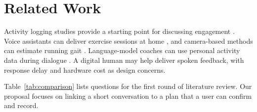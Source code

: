 \section{Related Work}\label{sec:related}
Activity logging studies provide a starting point for discussing engagement \cite{rayward2021}. Voice assistants can deliver exercise sessions at home \cite{jansons2022}, and camera-based methods can estimate running gait \cite{young2023}. Language-model coaches can use personal activity data during dialogue \cite{jorke2024}. A digital human may help deliver spoken feedback, with response delay and hardware cost as design concerns.

Table~\ref{tab:comparison} lists questions for the first round of literature review. Our proposal focuses on linking a short conversation to a plan that a user can confirm and record.


